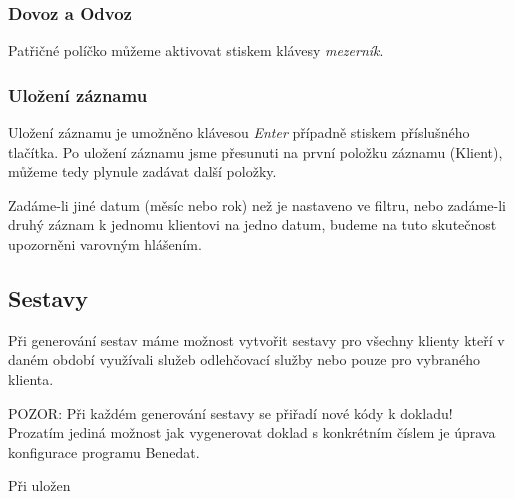 \documentclass[12pt]{article}
\newcommand{\kl}[1]{\emph{#1}}
\begin{document}
\subsubsection{Dovoz a Odvoz}
Patřičné políčko můžeme aktivovat stiskem klávesy \kl{mezerník}.

\subsubsection{Uložení záznamu}
Uložení záznamu je umožněno klávesou \kl{Enter} případně stiskem příslušného tlačítka. Po uložení
záznamu jsme přesunuti na první položku záznamu (Klient), můžeme tedy plynule zadávat další položky.

Zadáme-li jiné datum (měsíc nebo rok) než je nastaveno ve filtru, nebo zadáme-li druhý záznam k jednomu
klientovi na jedno datum, budeme na tuto skutečnost upozorněni varovným hlášením.

\subsection{Sestavy}
Při generování sestav máme možnost vytvořit sestavy pro všechny klienty kteří v daném období
využívali služeb odlehčovací služby nebo pouze pro vybraného klienta. 

POZOR: Při každém generování sestavy se přiřadí nové kódy k dokladu! Prozatím jediná možnost jak
vygenerovat doklad s konkrétním číslem je úprava konfigurace programu Benedat.

Při uložen
\end{document}
